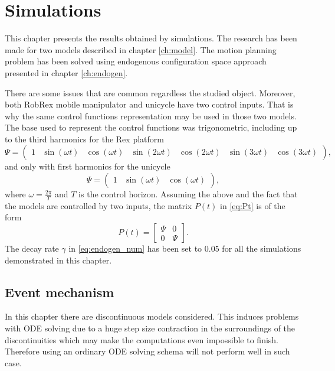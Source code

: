 \chapter{Simulations}
\label{ch:simul}
This chapter presents the results obtained by simulations. The research has been made for two models
described in chapter \ref{ch:model}. The motion planning problem has been solved using endogenous
configuration space approach presented in chapter \ref{ch:endogen}.

There are some issues that are common regardless the studied object. Moreover,
both RobRex mobile manipulator and unicycle have two control inputs. That is why
the same control functions representation may be used in those two models.
The base used to represent the control functions was trigonometric, including up to the third harmonics
for the Rex platform
\begin{equation}
\Psi=\begin{pmatrix}
1 & \sin(\omega t) & \cos(\omega t)& \sin(2\omega t) & \cos(2\omega t)& \sin(3\omega t) & \cos(3\omega t)
\end{pmatrix},
\end{equation}
and only with first harmonics for the unicycle
\begin{equation}
\Psi=\begin{pmatrix}
1 & \sin(\omega t) & \cos(\omega t)
\end{pmatrix},
\end{equation}
where $\omega=\frac{2\pi}{T}$ and $T$ is the control horizon. Assuming the above and
the fact that the models are controlled by two inputs, the
matrix $P(t)$ in \eqref{eq:Pt} is of the form
\begin{equation}
P(t)=\begin{bmatrix}
\Psi & 0\\
0 & \Psi
\end{bmatrix}.
\end{equation}
The decay rate $\gamma$ in \eqref{eq:endogen_num} has been set to $0.05$ for all
the simulations demonstrated in this chapter.

\section{Event mechanism}
In this chapter there are discontinuous models considered. This induces problems with ODE solving
due to a huge step size contraction in the surroundings of the discontinuities which may
make the computations even impossible to finish. Therefore using an ordinary ODE solving
schema will not perform well in such case.

